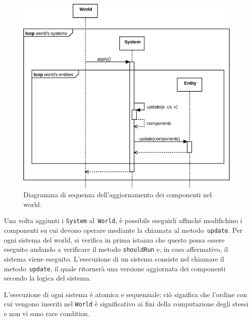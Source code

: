 \begin{figure}[H]
    \centering
    \includegraphics[width=\textwidth]{./img/Sequence}
    \caption{Diagramma di sequenza dell'aggiornamento dei componenti nel world.}\label{fig:sequence}
\end{figure}

Una volta aggiunti i \texttt{System} al~\texttt{World}, è possibile eseguirli affinché modifichino i componenti su cui
devono operare mediante la chiamata al metodo~\texttt{update}.
Per ogni sistema del world, si verifica in prima istanza che questo possa essere eseguito andando a verificare il metodo
\texttt{shouldRun} e, in caso affermativo, il sistema viene eseguito.
L'esecuzione di un sistema consiste nel chiamare il metodo~\texttt{update}, il quale ritornerà una versione aggiornata
dei componenti secondo la logica del sistema.

L'esecuzione di ogni sistema è atomica e sequenziale: ciò significa che l'ordine con cui vengono inseriti nel
\texttt{World} è significativo ai fini della computazione degli stessi e non vi sono race condition.
